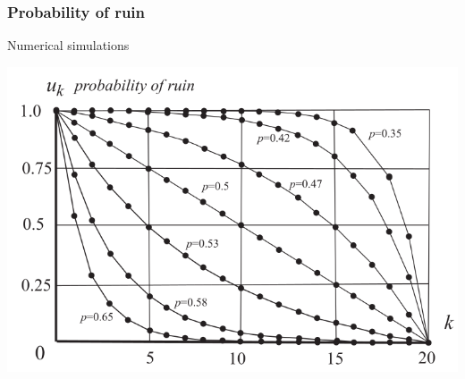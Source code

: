 \documentclass[spanish]{beamer}
\begin{document}
\begin{frame}
\frametitle{Probability of ruin}
Numerical simulations
\begin{center}
\includegraphics[scale=0.35]{im1.png}
\end{center}

\end{frame}
\end{document}
